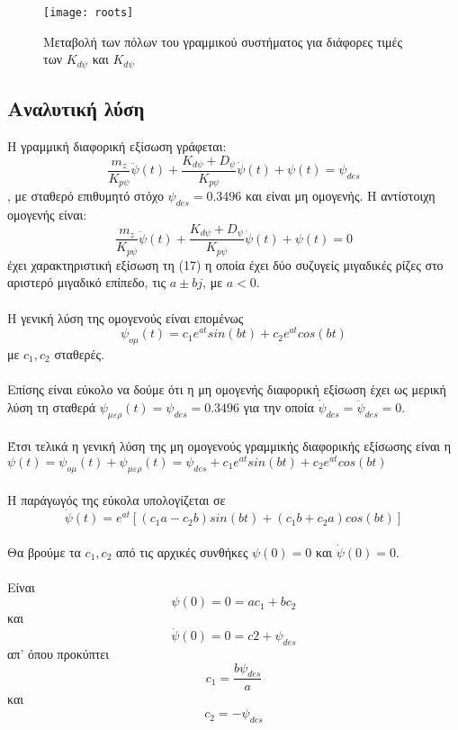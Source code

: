 \documentclass{article}
\begin{document}
\clearpage
\begin{landscape}                                                                             
\begin{figure}[hb]
 \centering
\texttt{[image: roots]}
\caption{Μεταβολή των πόλων του γραμμικού συστήματος για διάφορες τιμές των \(K_{d\psi}\) και \(K_{d\psi}\) }
\end{figure}
\end{landscape}                                                                             
 \clearpage

\subsection{Αναλυτική λύση}
Η γραμμική διαφορική εξίσωση  γράφεται: 
\[\frac{m_z}{K_{p\psi}}\ddot{\psi}(t) + \frac{K_{d\psi} + D_\psi}{K_{p\psi}}\dot{\psi}(t) + \psi(t) = \psi_{des}\], με σταθερό επιθυμητό στόχο \(\psi_{des} = 0.3496\) και είναι μη ομογενής. Η αντίστοιχη ομογενής είναι: \[\frac{m_z}{K_{p\psi}}\ddot{\psi}(t) + \frac{K_{d\psi} + D_\psi}{K_{p\psi}}\dot{\psi}(t) + \psi(t) = 0\]έχει χαρακτηριστική εξίσωση τη (17) η οποία έχει δύο συζυγείς μιγαδικές ρίζες στο αριστερό μιγαδικό επίπεδο, τις \(a \pm bj\), με \(a < 0\).\\\\Η γενική λύση της ομογενούς είναι επομένως 
\[\psi_{ομ}(t) = c_1e^{at}sin(bt) + c_2e^{at}cos(bt)\]
με \(c_1, c_2\) σταθερές.
\\\\Επίσης είναι εύκολο να δούμε ότι η μη ομογενής διαφορική εξίσωση έχει ως μερική λύση τη  σταθερά \(\psi_{μερ}(t) = \psi_{des} = 0.3496\) για την οποία \(\dot{\psi}_{des} = \ddot{\psi}_{des} = 0\).
\\\\Έτσι τελικά η γενική λύση της μη ομογενούς γραμμικής διαφορικής εξίσωσης είναι η \(\psi(t) = \psi_{ομ}(t) + \psi_{μερ}(t) = \psi_{des} + c_1e^{at}sin(bt) + c_2e^{at}cos(bt)\)
\\\\Η παράγωγός της εύκολα υπολογίζεται σε
\[\dot{\psi}(t) = e^{at}[(c_1a - c_2b)sin(bt) + (c_1b + c_2a)cos(bt)]\]
\\Θα βρούμε τα \(c_1, c_2\) από τις αρχικές συνθήκες \(\psi(0) = 0\) και \(\dot{\psi}(0) = 0\).
\\\\Είναι \[\psi(0) =  0 = ac_1 + bc_2\] και \[\dot{\psi}(0) = 0 = c2 + \psi_{des}\]απ' όπου προκύπτει \[c_1 = \frac{b\psi_{des}}{a}\] και \[c_2 = -\psi_{des}\]
\end{document}
